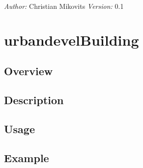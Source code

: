 \documentclass{scrartcl}
\begin{document}
\emph{Author:} Christian Mikovits
\emph{Version:} 0.1

\section{urbandevelBuilding}\hypertarget{urbandevelbuilding}{}\label{urbandevelbuilding}

\subsection{Overview}\hypertarget{overview}{}\label{overview}

\subsection{Description}\hypertarget{description}{}\label{description}

\subsection{Usage}\hypertarget{usage}{}\label{usage}

\subsection{Example}\hypertarget{example}{}\label{example}
\end{document}
